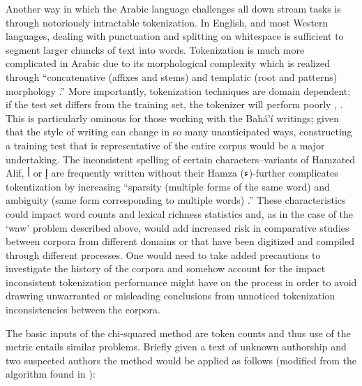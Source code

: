 \documentclass[12pt, oneside]{report}
\begin{document}
Another way in which the Arabic language challenges all down stream tasks is through notoriously intractable tokenization. In English, and most Western languages, dealing with punctuation and splitting on whitespace is sufficient to segment larger chuncks of text into words. Tokenization is much more complicated in Arabic due to its morphological complexity which is realized through ``concatenative (affixes and stems) and templatic (root and patterns) morphology \cite{habash_arabic_2006}.'' More importantly, tokenization techniques are domain dependent; if the test set differs from the training set, the tokenizer will perform poorly \cite{sajjad_challenging_2017}, \cite{habash_arabic_2006}. This is particularly ominous for those working with the Bah\'{a}'\'{i} writings; given that the style of writing can change in so many unanticipated ways, constructing a training test that is representative of the entire corpus would be a major undertaking. The inconsistent spelling of certain characters–variants of Hamzated Alif, أ or إ are frequently written without their Hamza (ء)-further complicates tokentization by increasing ``sparsity (multiple forms of the same word) and ambiguity (same form corresponding to multiple words) \cite{habash_arabic_2006}.'' These characteristics could impact word counts and lexical richness statistics and, as in the case of the `waw' problem described above, would add increased risk in comparative studies between corpora from different domains or that have been digitized and compiled through different processes. One would need to take added precautions to investigate the history of the corpora and somehow account for the impact inconsistent tokenization performance might have on the process in order to avoid drawring unwarranted or misleading conclusions from unnoticed tokenization inconsistencies between the corpora.
\par
The basic inputs of the chi-squared method are token counts and thus use of the metric entails similar problems. Briefly given a text of unknown authorship and two suspected authors the method would be applied as follows (modified from the algorithm found in \cite{laramee_introduction_2018}):
\end{document}

